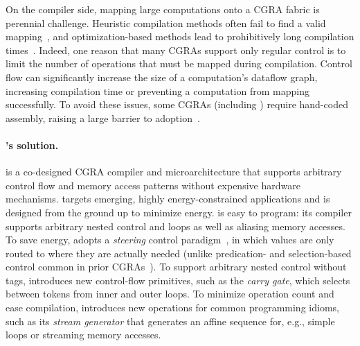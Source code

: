 On the compiler side, mapping large computations onto a CGRA fabric is
perennial challenge.
%
Heuristic compilation methods often fail to find a valid
mapping~\cite{chlorophyll,nowatzki2018hybrid}, and optimization-based methods lead to
prohibitively long compilation times~\cite{nowatzki2018hybrid,cgrame-ilp}.
%
Indeed, one reason that many CGRAs support only regular control is to limit
the number of operations that must be mapped during compilation.
%
Control flow can significantly increase the size of a computation's
dataflow graph, increasing compilation time or preventing a
computation from mapping successfully.
%
To avoid these issues, some CGRAs (including \snafu) require
hand-coded assembly, raising a large barrier to adoption~\cite{snafu,yang2021spzip,nowatzki:isca17:stream-dataflow}.

\paragraph{\riptide's solution.}
%
\riptide is a co-designed CGRA compiler and microarchitecture that
supports arbitrary control flow and memory access patterns
without expensive hardware mechanisms.
%
\riptide targets emerging, highly energy-constrained applications
and is designed from the ground up to minimize energy.
%
\riptide is easy to program: its compiler supports arbitrary nested
control and loops as well as aliasing memory accesses.
%
To save energy, \riptide adopts a \emph{steering} control
paradigm~\cite{dennis1975preliminary,swanson2003wavescalar,budiu2005dataflow}, in which values are only routed to
where they are actually needed (unlike predication- and
selection-based control common in prior
CGRAs~\cite{trips,snafu}).
%
To support arbitrary nested control without tags, \riptide introduces new
control-flow primitives, such as the \emph{carry gate}, which selects
between tokens from inner and outer loops.
%
To minimize operation count and ease compilation,
\riptide introduces new operations for common programming idioms,
such as its \emph{stream generator} that generates an affine
sequence for, e.g., simple loops or streaming memory accesses.


